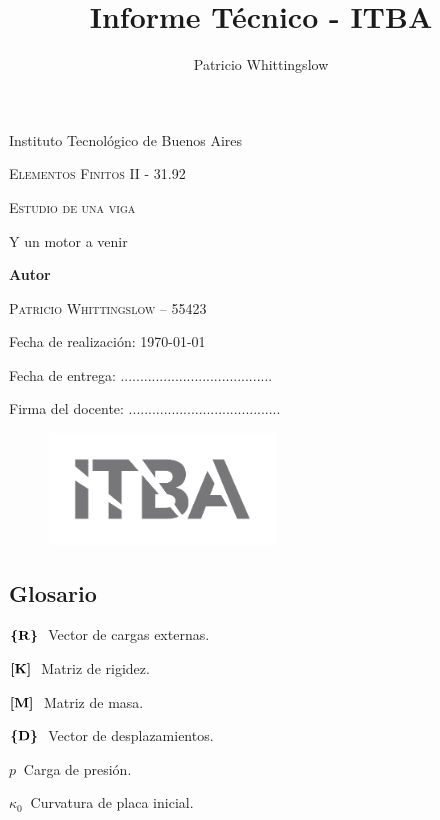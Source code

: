 \documentclass[onecolumn,10pt,titlepage,a4paper]{article}
\title{Informe Técnico - ITBA}
\author{Patricio Whittingslow}
\newcommand{\glossentry}[2]{$#1\ $ \indent #2 \par \vspace{.4cm} }
\begin{document}
\begin{titlepage}
	\centering
	
	{ \large Instituto Tecnológico de Buenos Aires  \par }
	\vspace{2cm}
	{\Large \scshape Elementos Finitos II - 31.92 \par}
	\vspace{2cm}
	{\Huge \scshape Estudio de una viga\par }
	\vspace{.5cm}
	{\Large Y un motor a venir \par}
	\vspace{2cm}
	{\large \bf Autor \par}
	\vspace{.5cm}
	\textsc{\large Patricio Whittingslow -- 55423}
	\vspace{2cm}
	{\par \large Fecha de realización: \today \par}
	\vspace{1cm}
	{\large Fecha de entrega: .......................................\par}
	\vspace{2.5cm}
	{\large Firma del docente: .......................................}
	\vspace{3cm}
	\begin{figure}[htb!]
		\centering
		\includegraphics[width=6cm]{fig/logoitba.png}
	\end{figure}
\end{titlepage}




\begin{multicols}{2}
	\section*{Glosario}
	\glossentry{\Cme{R}}{Vector de cargas externas.}
	\glossentry{\Mme{K}}{Matriz de rigidez.}
	\glossentry{\Mme{M}}{Matriz de masa.}
	\glossentry{\Cme{D}}{Vector de desplazamientos.}
	\glossentry{p}{Carga de presión.}
	\glossentry{\kappa_{0}}{Curvatura de placa inicial.}
\end{multicols}
\end{document}
